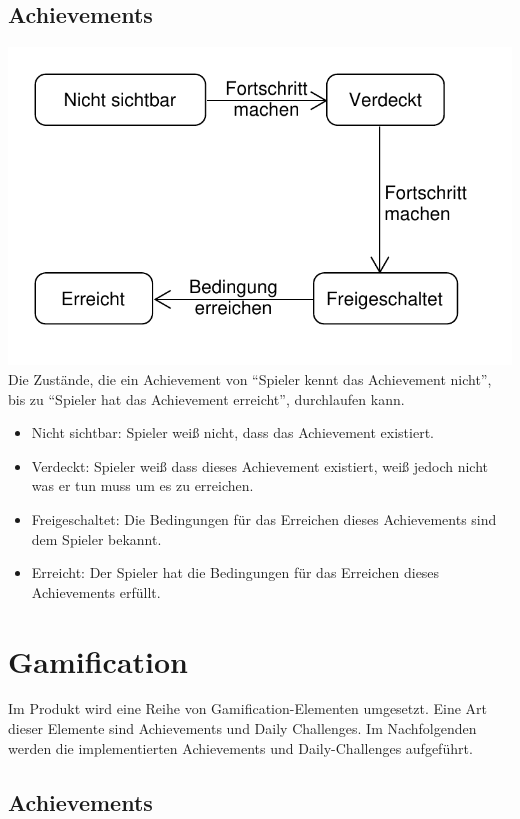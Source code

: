 \documentclass[a4paper]{scrreprt}
\begin{document}
	\section{Achievements}
	\label{fig:Achievement_State}
	\includegraphics[width=\textwidth]{img/Achievement_State.pdf}
	Die Zustände, die ein Achievement von \enquote{Spieler kennt das Achievement nicht}, bis zu \enquote{Spieler hat das Achievement erreicht}, durchlaufen kann.
	\begin{itemize}
		\item Nicht sichtbar: Spieler weiß nicht, dass das Achievement existiert.
		\item Verdeckt: Spieler weiß dass dieses Achievement existiert, weiß jedoch nicht was er tun muss um es zu erreichen.
		\item Freigeschaltet: Die Bedingungen für das Erreichen dieses Achievements sind dem Spieler bekannt.
		\item Erreicht: Der Spieler hat die Bedingungen für das Erreichen dieses Achievements erfüllt.
	\end{itemize}

	\chapter{Gamification}
	Im Produkt wird eine Reihe von Gamification-Elementen umgesetzt.
	Eine Art dieser Elemente sind Achievements und Daily Challenges.
	Im Nachfolgenden werden die implementierten Achievements und Daily-Challenges aufgeführt.

	\section{Achievements}
	\hypertarget{Ach}{}
\end{document}
